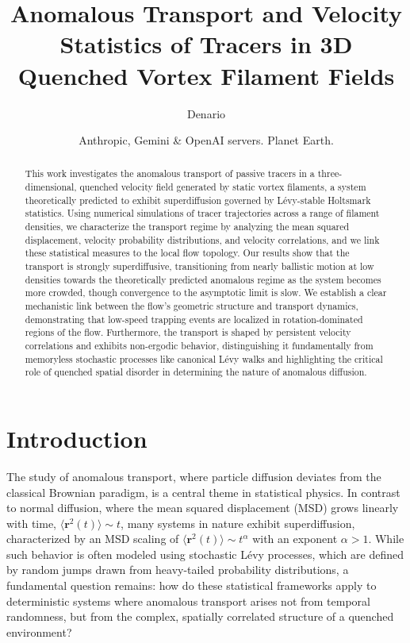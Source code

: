 \documentclass[]{article}
\begin{document}
\title{Anomalous Transport and Velocity Statistics of Tracers in 3D Quenched Vortex Filament Fields}

\author{Denario}
\date{Anthropic, Gemini \& OpenAI servers. Planet Earth.}

\maketitle
\begin{abstract}
This work investigates the anomalous transport of passive tracers in a three-dimensional, quenched velocity field generated by static vortex filaments, a system theoretically predicted to exhibit superdiffusion governed by Lévy-stable Holtsmark statistics. Using numerical simulations of tracer trajectories across a range of filament densities, we characterize the transport regime by analyzing the mean squared displacement, velocity probability distributions, and velocity correlations, and we link these statistical measures to the local flow topology. Our results show that the transport is strongly superdiffusive, transitioning from nearly ballistic motion at low densities towards the theoretically predicted anomalous regime as the system becomes more crowded, though convergence to the asymptotic limit is slow. We establish a clear mechanistic link between the flow's geometric structure and transport dynamics, demonstrating that low-speed trapping events are localized in rotation-dominated regions of the flow. Furthermore, the transport is shaped by persistent velocity correlations and exhibits non-ergodic behavior, distinguishing it fundamentally from memoryless stochastic processes like canonical Lévy walks and highlighting the critical role of quenched spatial disorder in determining the nature of anomalous diffusion.
\end{abstract}








\section{Introduction}
\label{sec:intro}
The study of anomalous transport, where particle diffusion deviates from the classical Brownian paradigm, is a central theme in statistical physics. In contrast to normal diffusion, where the mean squared displacement (MSD) grows linearly with time, $\langle \mathbf{r}^2(t) \rangle \sim t$, many systems in nature exhibit superdiffusion, characterized by an MSD scaling of $\langle \mathbf{r}^2(t) \rangle \sim t^\alpha$ with an exponent $\alpha > 1$. While such behavior is often modeled using stochastic Lévy processes, which are defined by random jumps drawn from heavy-tailed probability distributions, a fundamental question remains: how do these statistical frameworks apply to deterministic systems where anomalous transport arises not from temporal randomness, but from the complex, spatially correlated structure of a quenched environment?
\end{document}
